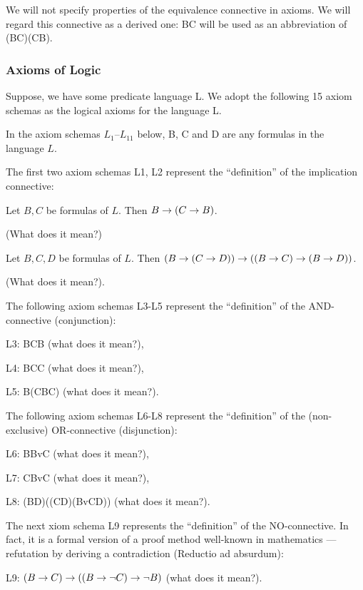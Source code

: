 We will not specify properties of the equivalence connective in axioms. We will regard this connective as a derived one: B\IFF C will be used as an abbreviation of (B\IMPLIES C)\AND (C\IMPLIES B).

\subsubsection*{Axioms of Logic}

Suppose, we have some predicate language L. We adopt the following 15 axiom schemas as the logical axioms for the language L.

In the axiom schemas \(L_1\)--\(L_{11}\) below, B, C and D are any formulas in the language \(L\).

The first two axiom schemas L1, L2 represent the ``definition'' of the implication connective:

\begin{ax}[]
Let \(B,C\) be formulas of \(L\).
Then \(B\rightarrow (C\rightarrow B)\).
\end{ax}
(What does it mean?)

\begin{ax}[]
Let \(B,C,D\) be formulas of \(L\).
Then \((B\rightarrow (C\rightarrow D))\rightarrow ((B\rightarrow C)\rightarrow (B\rightarrow D))\).
\end{ax}
(What does it mean?).

The following axiom schemas L3-L5 represent the ``definition'' of the AND-connective (conjunction):

L3: B\AND C\IMPLIES B (what does it mean?),

L4: B\AND C\IMPLIES C (what does it mean?),

L5: B\IMPLIES (C\IMPLIES B\AND C) (what does it mean?).

The following axiom schemas L6-L8 represent the ``definition'' of the (non-exclusive) OR-connective (disjunction):

L6: B\IMPLIES BvC (what does it mean?),

L7: C\IMPLIES BvC (what does it mean?),

L8: (B\IMPLIES D)\IMPLIES ((C\IMPLIES D)\IMPLIES (BvC\IMPLIES D)) (what does it mean?).

The next xiom schema L9 represents the ``definition'' of the NO-connective. In fact, it is a formal version of a proof method well-known in mathematics --- refutation by deriving a contradiction (Reductio ad absurdum):

L9: \((B\rightarrow C)\rightarrow ((B\rightarrow \neg C)\rightarrow \neg B)\) (what does it mean?).

